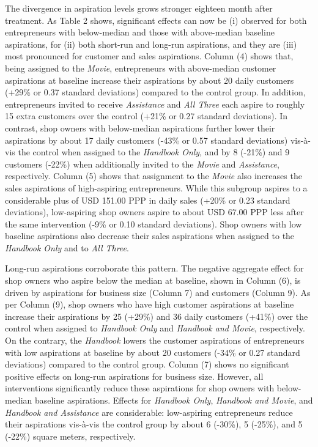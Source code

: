 \documentclass[11.5pt]{article}
\begin{document}
The divergence in aspiration levels grows stronger eighteen month after treatment. As Table 2 shows, significant effects can now be (i) observed for both entrepreneurs with below-median and those with above-median baseline aspirations, for (ii) both short-run and long-run aspirations, and they are (iii) most pronounced for customer and sales aspirations. Column (4) shows that, being assigned to the \emph{Movie}, entrepreneurs with above-median customer aspirations at baseline increase their aspirations by about 20 daily customers (+29\% or 0.37 standard deviations) compared to the control group. In addition, entrepreneurs invited to receive \emph{Assistance} and \emph{All Three} each aspire to roughly 15 extra customers over the control (+21\% or 0.27 standard deviations). In contrast, shop owners with below-median aspirations further lower their aspirations by about 17 daily customers (-43\% or 0.57 standard deviations) vis-\`{a}-vis the control when assigned to the \emph{Handbook Only}, and by 8 (-21\%) and 9 customers (-22\%) when additionally invited to the \emph{Movie} and \emph{Assistance}, respectively. Column (5) shows that assignment to the \emph{Movie} also increases the sales aspirations of high-aspiring entrepreneurs. While this subgroup aspires to a considerable plus of USD 151.00 PPP in daily sales (+20\% or 0.23 standard deviations), low-aspiring shop owners aspire to about USD 67.00 PPP less after the same intervention (-9\% or 0.10 standard deviations). Shop owners with low baseline aspirations also decrease their sales aspirations when assigned to the \emph{Handbook Only} and to \emph{All Three}.

Long-run aspirations corroborate this pattern. The negative aggregate effect for shop owners who aspire below the median at baseline, shown in Column (6), is driven by aspirations for business size (Column 7) and customers (Column 9). As per Column (9), shop owners who have high customer aspirations at baseline increase their aspirations by 25 (+29\%) and 36 daily customers (+41\%) over the control when assigned to \emph{Handbook Only} and \emph{Handbook and Movie}, respectively. On the contrary, the \emph{Handbook} lowers the customer aspirations of entrepreneurs with low aspirations at baseline by about 20 customers (-34\% or 0.27 standard deviations) compared to the control group. Column (7) shows no significant positive effects on long-run aspirations for business size. However, all interventions significantly reduce these aspirations for shop owners with below-median baseline aspirations. Effects for \emph{Handbook Only}, \emph{Handbook and Movie}, and \emph{Handbook and Assistance} are considerable: low-aspiring entrepreneurs reduce their aspirations vis-\`{a}-vis the control group by about 6 (-30\%), 5 (-25\%), and 5 (-22\%) square meters, respectively.
\end{document}
